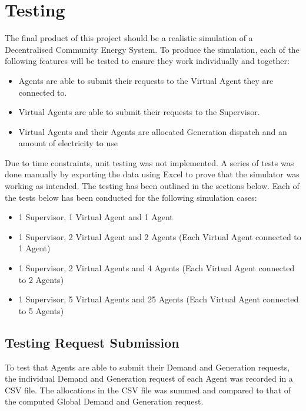 \chapter{Testing}
\label{Testing}

The final product of this project should be a realistic simulation of a Decentralised Community Energy System. To produce the simulation, each of the following features will be tested to ensure they work individually and together:

\begin{itemize}
\item Agents are able to submit their requests to the Virtual Agent they are connected to.
\item Virtual Agents are able to submit their requests to the Supervisor.
\item Virtual Agents and their Agents are allocated Generation dispatch and an amount of electricity to use 
\end{itemize}

Due to time constraints, unit testing was not implemented. A series of tests was done manually by exporting the data using Excel to prove that the simulator was working as intended. The testing has been outlined in the sections below. Each of the tests below has been conducted for the following simulation cases:

\begin{itemize}
	\item 1 Supervisor, 1 Virtual Agent and 1 Agent
	\item 1 Supervisor, 2 Virtual Agent and 2 Agents (Each Virtual Agent connected to 1 Agent)
	\item 1 Supervisor, 2 Virtual Agents and 4 Agents (Each Virtual Agent connected to 2 Agents)
	\item 1 Supervisor, 5 Virtual Agents and 25 Agents (Each Virtual Agent connected to 5 Agents)
\end{itemize}

\section*{Testing Request Submission} %
To test that Agents are able to submit their Demand and Generation requests, the individual Demand and Generation request of each Agent was recorded in a CSV file. The allocations in the CSV file was summed and compared to that of the computed Global Demand and Generation request.

